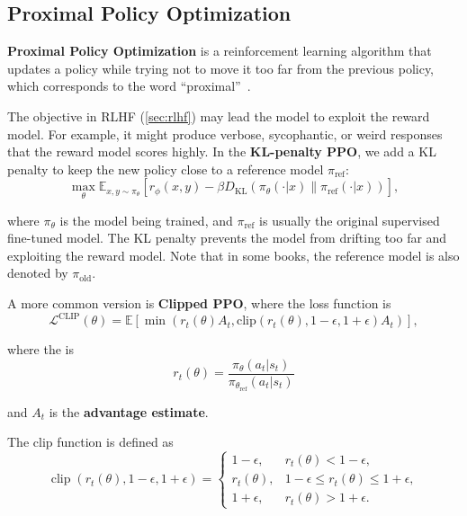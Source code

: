 \subsection{Proximal Policy Optimization}

\textbf{Proximal Policy Optimization} is a reinforcement learning algorithm that updates a policy while trying not to move it too far from the previous policy, which corresponds to the word ``proximal''~\cite{schulman2017proximal}.

The objective in RLHF (\ref{sec:rlhf}) may lead the model to exploit the reward model. For example, it might produce verbose, sycophantic, or weird responses that the reward model scores highly. In the \textbf{KL-penalty PPO}, we add a KL penalty to keep the new policy close to a reference model \(\pi_\text{ref}\):
\[
	\max_\theta \mathbb{E}_{x, y \sim \pi_\theta}
	\left[
		r_\phi(x, y) -
		\beta D_{\text{KL}} \left( \pi_\theta(\cdot | x) \| \pi_\text{ref}(\cdot | x) \right)
		\right],
\]

where \(\pi_\theta\) is the model being trained, and \(\pi_\text{ref}\) is usually the original supervised fine-tuned model. The KL penalty prevents the model from drifting too far and exploiting the reward model. Note that in some books, the reference model is also denoted by \(\pi_\text{old}\).

A more common version is \textbf{Clipped PPO}, where the loss function is
\begin{equation}
	\mathcal{L}^{\text{CLIP}}(\theta) = \mathbb{E} \left[
	\min \left( r_t(\theta)A_t, \text{clip}(r_t(\theta), 1-\epsilon, 1+\epsilon)A_t \right)
	\right],
\end{equation}

where the  is
\begin{equation}
	r_t(\theta) = \frac{\pi_\theta(a_t | s_t)}{\pi_{\theta_\text{ref}}(a_t | s_t)}
\end{equation}

and \(A_t\) is the \textbf{advantage estimate}.

The clip function is defined as
\begin{equation}
	\operatorname{clip}(r_t(\theta), 1-\epsilon, 1+\epsilon)
	=
	\begin{cases}
		1-\epsilon,  & r_t(\theta) < 1-\epsilon,                  \\[4pt]
		r_t(\theta), & 1-\epsilon \le r_t(\theta) \le 1+\epsilon, \\[4pt]
		1+\epsilon,  & r_t(\theta) > 1+\epsilon.
	\end{cases}
\end{equation}

